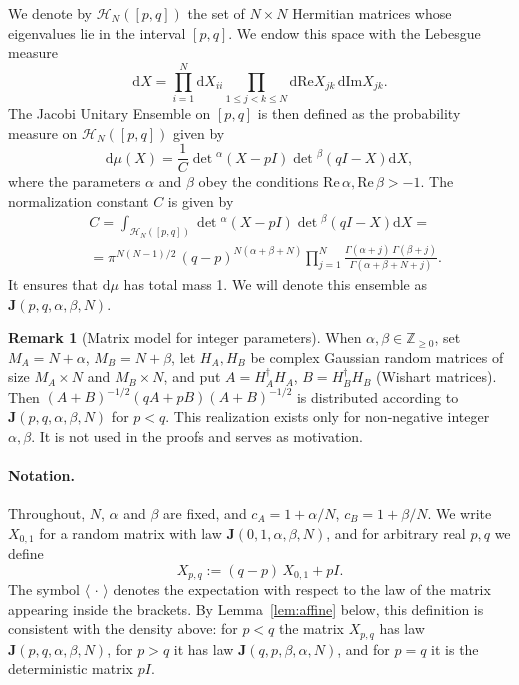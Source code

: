 \documentclass{article}
\newcommand{\dif}{\mathrm{d}}
\theoremstyle{plain}
\theoremstyle{definition}
\newtheorem{remark}[thm]{Remark}
\numberwithin{equation}{section}
\begin{document}
We denote by $\mathcal{H}_N([p, q])$ the set of $N \times N$ Hermitian matrices whose eigenvalues lie in the interval $[p, q]$. We endow this space with the Lebesgue measure
\begin{equation}
    \dif X = \prod_{i=1}^N \dif X_{ii} \prod_{1 \le j < k \le N} \dif \mathrm{Re}X_{jk} \,\dif \mathrm{Im} X_{jk}.
\end{equation}
The Jacobi Unitary Ensemble on $[p, q]$ is then defined as the probability measure on $\mathcal{H}_N([p, q])$ given by
\begin{equation}
    \dif \mu (X) = \frac{1}{C} \det{}^\alpha (X - p I) \det{}^\beta (qI - X) \dif X,
\end{equation}
where the parameters $\alpha$ and $\beta$ obey the conditions $\mathrm{Re}\,\alpha, \mathrm{Re}\,\beta > -1$. The normalization constant $C$ is given by 
\begin{equation}
    \begin{aligned}
        & C = \int_{\mathcal{H}_N([p,q])} \det{}^\alpha (X - pI) \det{}^\beta (q I - X) \dif X = \\
        & = \pi^{N(N-1)/2}\,(q-p)^{N(\alpha+\beta+N)}\prod_{j=1}^{N}\frac{\Gamma(\alpha+j)\,\Gamma(\beta+j)}{\Gamma(\alpha+\beta+N+j)} .
    \end{aligned}
\end{equation}
It ensures that $\dif \mu$ has total mass 1. We will denote this ensemble as $\mathbf{J}(p,q,\alpha,\beta, N)$. 

\begin{remark}[Matrix model for integer parameters]
When $\alpha,\beta\in\mathbb Z_{\ge0}$, set $M_A=N+\alpha$, $M_B=N+\beta$, let $H_A,H_B$ be complex Gaussian
random matrices of size $M_A\times N$ and $M_B\times N$, and put $A=H_A^\dagger H_A$, $B=H_B^\dagger H_B$ (Wishart matrices).
Then $(A+B)^{-1/2}(qA+pB)(A+B)^{-1/2}$ is distributed according to $\mathbf J(p,q,\alpha,\beta,N)$ for $p<q$.
This realization exists only for non-negative integer $\alpha,\beta$. It is not used in the proofs and serves as motivation.
\end{remark}

\paragraph{Notation.}
Throughout, $N$, $\alpha$ and $\beta$ are fixed, and $c_A=1+\alpha/N$, $c_B=1+\beta/N$.
We write $X_{0,1}$ for a random matrix with law $\mathbf J(0,1,\alpha,\beta,N)$, and for arbitrary real $p,q$ we define
\begin{equation}
    \label{eq:Xpq-def}
    X_{p,q}:=(q-p)\,X_{0,1}+pI.
\end{equation}
The symbol $\langle\,\cdot\,\rangle$ denotes the expectation with respect to the law of the matrix appearing inside the brackets.
By Lemma~\ref{lem:affine} below, this definition is consistent with the density above: for $p<q$ the matrix $X_{p,q}$ has law $\mathbf J(p,q,\alpha,\beta,N)$, for $p>q$ it has law $\mathbf J(q,p,\beta,\alpha,N)$, and for $p=q$ it is the deterministic matrix $pI$.
\end{document}
